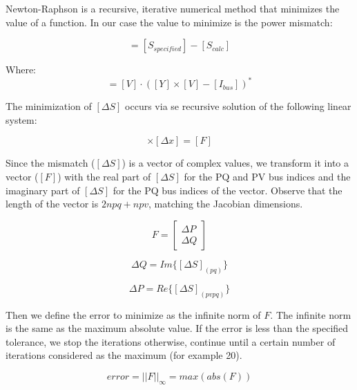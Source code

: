 \documentclass[nols,a4paper,twoside,notoc,fleqn]{tufte-book}
\begin{document}
Newton-Raphson is a recursive, iterative numerical method that minimizes the value of a function. In our case the value to minimize is the power mismatch:

\begin{equation}
[\Delta S] = [S_{specified}] - [S_{calc} ]
\end{equation}

Where:
\begin{equation}
[S_{calc}] = [V] \cdot ([Y] \times [V] - [I_{bus}])^*
\label{eq:nr_Scalc}
\end{equation}

The minimization of $[\Delta S]$ occurs via se recursive solution of the following linear system:

\begin{equation}
[J] \times [\Delta x] = [F]
\end{equation}

Since the mismatch ($[\Delta S]$) is a vector of complex values, we transform it into a vector ($[F]$) with the real part of $[\Delta S]$ for the PQ and PV bus indices and the imaginary part of $[\Delta S]$ for the PQ bus indices of the vector. Observe that the length of the vector is $2npq+npv$, matching the Jacobian dimensions.



\begin{equation}
F =  \left[
\begin{array}{c}
\Delta P \\
\Delta Q  
\end{array}
\right]
\label{eq:nr_mismatch}
\end{equation}

\begin{equation}
\Delta Q = Im \{ [\Delta S]_{(pq)} \}
\label{eq:nr_q_inc}
\end{equation}

\begin{equation}
\Delta P = Re \{ [\Delta S]_{(pvpq)}  \} 
\label{eq:nr_p_inc}
\end{equation}

Then we define the error to minimize as the infinite norm of $F$. The infinite norm is the same as the maximum absolute value. If the error is less than the specified tolerance, we stop the iterations otherwise, continue until a certain number of iterations considered as the maximum (for example 20).

\begin{equation}
error = ||F||_{\infty} = max(abs(F))
\label{eq:nr_error}
\end{equation}
\end{document}
